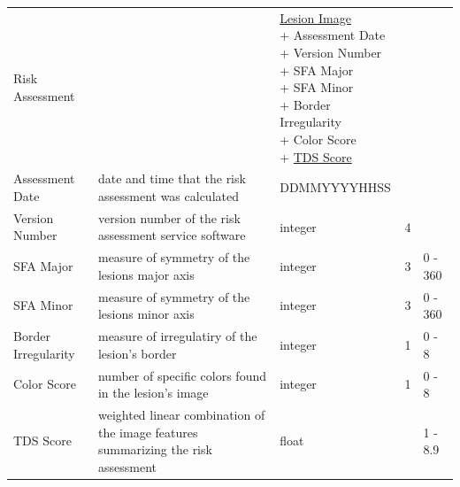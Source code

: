 {\begin{longtable}[H]{ | p{2.5cm} | p{2.5cm} | p{2.5cm} | p{1.0cm} | p{2.5cm} | }
                     & & \\ \hline

                    Risk Assessment &  &

                        \specialcell[t]{\hyperlink{lesion_image}{Lesion Image}
                            \\ + Assessment Date
                            \\ + Version Number
                            \\ + SFA Major
                            \\ + SFA Minor
                            \\ + Border Irregularity
                            \\ + Color Score
                            \\ + \hyperlink{tds_score}{TDS Score}
                        }

                    & & \\ \hline

                    Assessment Date & date and time that the risk assessment was calculated &
                    DDMMYYYYHHSS &  &  \\ \hline

                    Version Number & version number of the risk assessment service software &
                    integer & 4 &  \\ \hline

                    SFA Major & measure of symmetry of the lesions major axis &
                    integer & 3 & 0 - 360 \\ \hline

                    SFA Minor & measure of symmetry of the lesions minor axis &
                    integer & 3 & 0 - 360 \\ \hline

                    Border Irregularity & measure of irregulatiry of the lesion's border &
                    integer & 1 & 0 - 8 \\ \hline

                    Color Score & number of specific colors found in the lesion's image &
                    integer & 1 & 0 - 8 \\ \hline

                    \hypertarget{tds_score}{TDS Score} & weighted linear combination of the image features summarizing the risk assessment  &
                    float &  & 1 - 8.9 \\ \hline


\end{longtable}}
